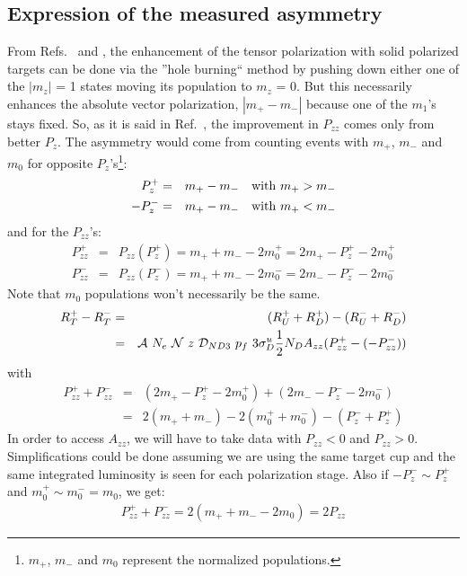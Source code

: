 \documentclass[11pt]{article}
\begin{document}
\subsection{Expression of the measured asymmetry}

From Refs.~\cite{meyer} and \cite{uvatn}, the enhancement of the  tensor polarization with solid polarized targets can be done via the ''hole burning`` method by pushing down either one of the $|m_z|$ = 1 states moving its population to $m_z$ = 0. But this necessarily enhances the absolute vector polarization, $|m_+ - m_-|$ because one of the $m_1$'s stays fixed.
So, as it is said in Ref.~\cite{meyer}, the improvement in $P_{zz}$ comes only from better $P_z$. The asymmetry would come from counting events with $m_+$, $m_-$ and $m_0$ for opposite $P_z$'s\footnote{$m_+$, $m_-$ and $m_0$ represent the normalized populations.}:
\begin{eqnarray}
P_z^+ &=& m_+ - m_- ~~~{\rm with}~  m_+ > m_- \\
-P_z^- &=& m_+ - m_- ~~~{\rm with}~ m_+ < m_-
\label{p1} 
\end{eqnarray}
and for the  $P_{zz}$'s:
\begin{eqnarray}
P_{zz}^+ &=& P_{zz}(P_z^+) = m_+ + m_- - 2m_0^+ = 2m_+ - P_z^+ - 2m_0^+ \\
P_{zz}^- &=& P_{zz}(P_z^-) =  m_+ + m_- - 2m_0^- =   2m_- - P_z^- - 2m_0^-
\label{p2} 
\end{eqnarray}
Note that $m_0$ populations won't necessarily be the same.
\begin{eqnarray}
R^+_T - R^-_T &=& (R_U^+ + R_D^+)- (R_U^- + R_D^-) \\ 
                            &=& {\cal A}~N_e~{\cal N}~z~ {\cal D}_{ND3}~p_f~ 3 \sigma^u_D \frac{1}{2} N_D A_{zz} (P_{zz}^+ - (- P_{zz}^-))
\label{p3} 
\end{eqnarray}
with 
\begin{eqnarray}
P_{zz}^+ + P_{zz}^- &=& (2m_+ - P_z^+ - 2m_0^+) + (2m_- - P_z^- - 2m_0^-) \\
                                    &=& 2 (m_+ + m_-) - 2(m_0^+ + m_0^-) - (P_z^- + P_z^+)
\label{p3} 
\end{eqnarray}
In order to access $A_{zz}$, we will have to take data with $P_{zz} < 0$ and  $P_{zz} > 0$.
Simplifications could be done assuming we are using the same target cup and the same integrated luminosity is seen for each polarization stage.
Also if $-P_z^- \sim P_z^+$ and $m_0^+ \sim m_0^- = m_0$, we get:
\begin{eqnarray}
P_{zz}^+ + P_{zz}^- = 2 (m_+ + m_- - 2 m_0) = 2 P_{zz}
\label{p4} 
\end{eqnarray}
\end{document}
